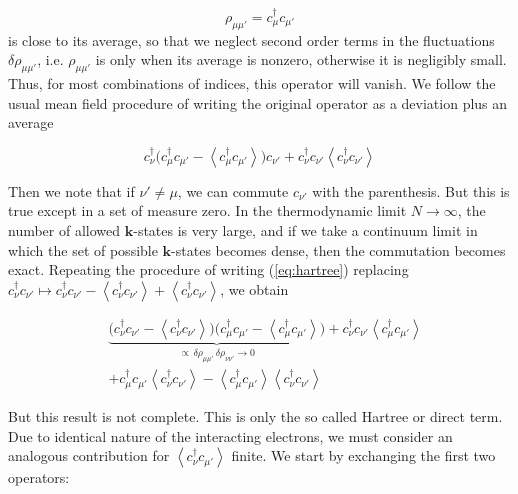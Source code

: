 \documentclass[10pt, twocolumn, twoside]{article}
\begin{document}
\begin{equation}
\rho_{\mu\mu'} = c_{\mu}^\dagger c_{\mu'}
\end{equation}
is close to its average, so that we neglect second order terms in the fluctuations $\delta \rho_{\mu\mu'}$, i.e. $\rho_{\mu\mu'}$ is  only when its average is nonzero, otherwise it is negligibly small. Thus, for most combinations of indices, this operator will vanish. We follow the usual mean field procedure of writing the original operator as a deviation plus an average

\begin{equation}\label{eq:hartree}
c_{\nu}^\dagger \bigg( c_\mu^\dagger c_{\mu'} - \left\langle c_\mu^\dagger c_{\mu'} \right\rangle \bigg) c_{\nu'} + c_{\nu}^\dagger c_{\nu'} \left\langle c_\nu^\dagger c_{\nu'} \right\rangle
\end{equation}

Then we note that if $\nu' \neq \mu$, we can commute $c_{\nu'}$ with the parenthesis. But this is true except in a set of measure zero. In the thermodynamic limit $N \rightarrow \infty$, the number of allowed $\bm k$-states is very large, and if we take a continuum limit in which the set of possible $\bm k$-states becomes dense, then the commutation becomes exact. Repeating the procedure of writing (\ref{eq:hartree}) replacing $c_\nu^\dagger c_{\nu'} \mapsto c_\nu^\dagger c_{\nu'} - \left\langle c_\nu^\dagger c_{\nu'} \right\rangle + \left\langle c_\nu^\dagger c_{\nu'} \right\rangle $, we obtain

\begin{equation}
\begin{split}
&\underbrace{\big( c_\nu^\dagger c_{\nu'} - \left\langle c_\nu^\dagger c_{\nu'} \right\rangle \big) \big( c_\mu^\dagger c_{\mu'} - \left\langle c_\mu^\dagger c_{\mu'} \right\rangle \big)}_{\propto \, \delta \rho_{\mu\mu'} \, \delta \rho_{\nu\nu'} \rightarrow 0} + c_\nu^\dagger c_{\nu'} \left\langle c_\mu^\dagger c_{\mu'} \right\rangle \\
&+ c_\mu^\dagger c_{\mu'} \left\langle c_\nu^\dagger c_{\nu'} \right\rangle - \left\langle c_\mu^\dagger c_{\mu'} \right\rangle \left\langle c_\nu^\dagger c_{\nu'} \right\rangle
\end{split}
\end{equation}

But this result is not complete. This is only the so called Hartree or direct term. Due to identical nature of the interacting electrons, we must consider an analogous contribution for $\left\langle c_\nu^\dagger c_{\mu'} \right\rangle$ finite. We start by exchanging the first two operators: 
\end{document}

